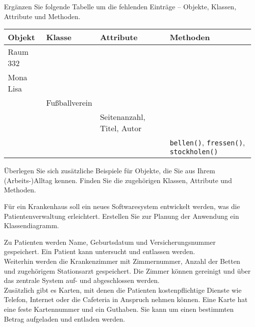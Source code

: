 \documentclass[11pt, a4paper, oneside]{article}
\begin{document}
	
	
	
	Ergänzen Sie folgende Tabelle um die fehlenden Einträge -- Objekte, Klassen, Attribute und Methoden.
	
	\begin{table}[h]
		\centering
		\setlength\tabcolsep{.25cm}
		\renewcommand{\arraystretch}{1.5}
		\begin{tabularx}{\textwidth}{|X|X|X|X|}
			\hline
			\textbf{Objekt} & \textbf{Klasse} & \textbf{Attribute} & \textbf{Methoden}\\
			\hline
			Raum 332\vspace{1cm} & & &\\
			\hline
			Mona Lisa\vspace{1cm} &&&\\
			\hline
			& Fußballverein\vspace{1cm} & &\\
			\hline
			&& Seitenanzahl, Titel, Autor\vspace{.5cm} &\\
			\hline
			&&&\texttt{bellen()}, \texttt{fressen()}, \texttt{stockholen()}\\
			\hline
		\end{tabularx}
	\end{table}

	
	Überlegen Sie sich zusätzliche Beispiele für Objekte, die Sie aus Ihrem (Arbeits-)Alltag kennen.
	Finden Sie die zugehörigen Klassen, Attribute und Methoden.
	
	\pagebreak
	
	
	
	Für ein Krankenhaus soll ein neues Softwaresystem entwickelt werden, was die Patientenverwaltung erleichtert.
	Erstellen Sie zur Planung der Anwendung ein Klassendiagramm.
	
	Zu Patienten werden Name, Geburtsdatum und Versicherungsnummer gespeichert.
	Ein Patient kann untersucht und entlassen werden.\\
	Weiterhin werden die Krankenzimmer mit Zimmernummer, Anzahl der Betten und zugehörigem Stationsarzt gespeichert.
	Die Zimmer können gereinigt und über das zentrale System auf- und abgeschlossen werden.\\
	Zusätzlich gibt es Karten, mit denen die Patienten kostenpflichtige Dienste wie Telefon, Internet oder die Cafeteria in Anspruch nehmen können.
	Eine Karte hat eine feste Kartennummer und ein Guthaben.
	Sie kann um einen bestimmten Betrag aufgeladen und entladen werden.
	
\end{document}
